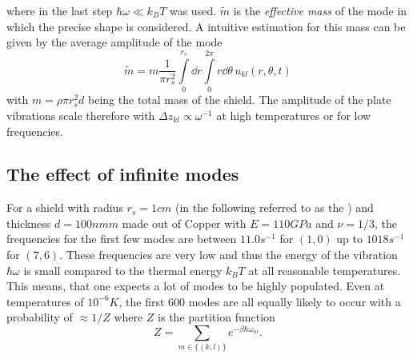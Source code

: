 where in the last step $\hbar\omega \ll k_B T$ was used. $\tilde{m}$ is the \textit{effective mass} of the mode in which the precise shape is considered. A intuitive estimation for this mass can be given by the average amplitude of the mode 
\begin{equation}\label{eq:5:effective-mass}
  \tilde{m} = m\frac{1}{\pi r_s^2}\int\limits_0^{r_s} \dd r \int\limits_0^{2\pi} r\dd\theta \, u_{kl}(r, \theta, t)
\end{equation}
with $m=\rho \pi r_s^2 d$ being the total mass of the shield.
The amplitude of the plate vibrations scale therefore with $\Delta z_{kl} \propto \omega^{-1}$ at high temperatures or for low frequencies.




\subsection*{The effect of infinite modes}
For a shield with radius $r_s = 1\si{cm}$ (in the following referred to as the ) and thickness $d=100\si{nmm}$ made out of Copper with $E = 110\si{GPa}$ and $\nu = 1/3$, the frequencies for the first few modes are between $11.0\si{s^{-1}}$ for $(1,0)$ up to $1018\si{s^{-1}}$ for $(7,6)$.
These frequencies are very low and thus the energy of the vibration $\hbar \omega$ is small compared to the thermal energy $k_B T$ at all reasonable temperatures.
This means, that one expects a lot of modes to be highly populated. Even at temperatures of $10^{-6} \si{K}$, the first $600$ modes are all equally likely to occur with a probability of $\approx 1/Z$ where $Z$ is the partition function
\begin{equation}
  Z = \sum_{m\in\{(k,l)\}} e^{-\beta \hbar \omega_m} .
\end{equation}

